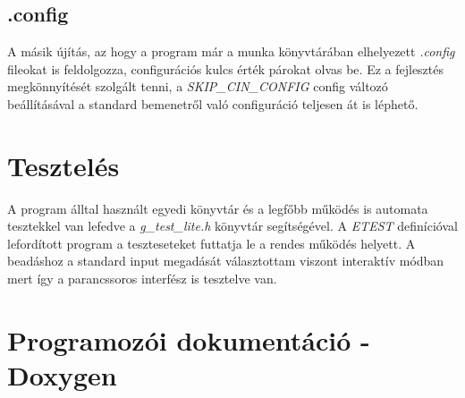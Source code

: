 \documentclass{article}[12pt,a4paper]
\begin{document}
    \subsection{.config}
    A másik újítás, az hogy a program már a munka könyvtárában elhelyezett \textit{.config} fileokat is feldolgozza, configurációs kulcs érték párokat olvas be.
    Ez a fejlesztés megkönnyítését szolgált tenni, a \textit{SKIP\_CIN\_CONFIG} config változó beállításával a standard bemenetről való configuráció teljesen át is léphető.

    \section{Tesztelés}
    A program álltal használt egyedi könyvtár és a legfőbb működés is automata tesztekkel van lefedve a \textit{g\_test\_lite.h} könyvtár segítségével.
    A \textit{ETEST} definícióval lefordított program a teszteseteket futtatja le a rendes működés helyett.
    A beadáshoz a standard input megadását választottam viszont interaktív módban mert így a parancssoros interfész is tesztelve van.

    \section{Programozói dokumentáció - Doxygen}
\end{document}
